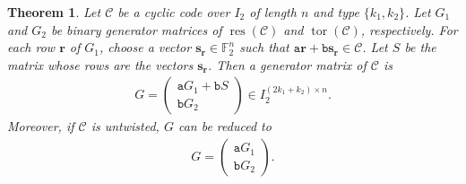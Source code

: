 \documentclass[12pt]{article}
\newtheorem{theorem}{Theorem}[section]
\theoremstyle{definition}
\theoremstyle{plain}
\newcommand{\Blue}[1]{{ \color{blue} #1}}
\begin{document}
\begin{theorem}  \label{thm:gen-matrix-cyclic-I2-codes}
Let $\mathcal{C}$ be a cyclic code over $I_2$ of length $n$ and type $\{ k_1 , k_2 \}$. Let $G_1$ and $G_2$ be binary generator matrices of $\operatorname{res}( \mathcal{C} )$ and $\operatorname{tor}( \mathcal{C} )$, respectively. For each row $\mathbf{r}$ of $G_1$, choose a vector $\mathbf{s}_{\mathbf{r}} \in \mathbb{F}_2^n$ such that
$
\mathtt{a}\mathbf{r} + \mathtt{b}\mathbf{s}_{\mathbf{r}} \in \mathcal{C}
$.
Let $S$ be the matrix whose rows are the vectors $\mathbf{s}_{\mathbf{r}}$. Then a generator matrix of $\mathcal{C}$ is
\begin{align*}
G = \begin{pmatrix}
\mathtt{a}G_1 + \mathtt{b} S  \\ %
\mathtt{b}G_2
\end{pmatrix}
\in I_2^{ ( 2k_1 + k_2 ) \times n}  .
\end{align*}
Moreover, if $\mathcal{C}$ is untwisted, $G$ can be reduced to
\begin{align*}
G = \begin{pmatrix} \mathtt{a}G_1 \\
 \mathtt{b}G_2 \end{pmatrix}.
\end{align*}
\end{theorem}
\end{document}
